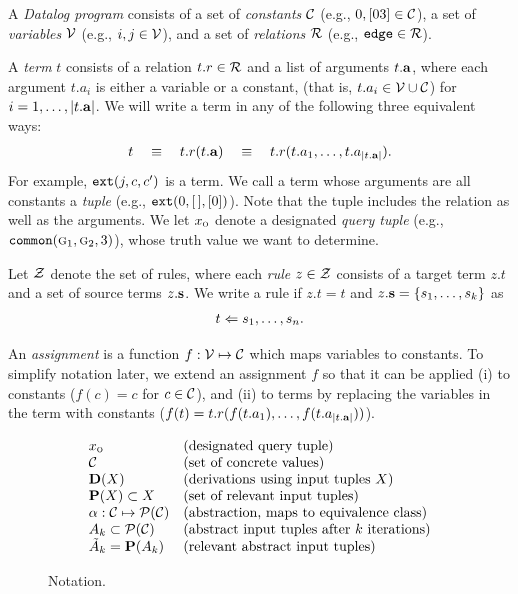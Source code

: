 
A {\em Datalog program} consists of
a set of {\em constants} $\mathcal{C}$ (e.g., $0,[03] \in \mathcal{C}$),
a set of {\em variables} $\mathcal{V}$ (e.g., $i, j \in \mathcal{V}$), and
a set of {\em relations} $\mathcal{R}$ (e.g., $\text{\tt edge} \in \mathcal{R}$).

A {\em term} $t$ consists of a relation $t.r \in \mathcal{R}$ and a list of arguments $t.\mathbf{a}$,
where each argument $t.a_i$ is either a variable or a constant,
(that is, $t.a_i \in \mathcal{V} \cup \mathcal{C}$) for $i = 1, \dots, |t.\mathbf{a}|$.
We will write a term in any of the following three equivalent ways:
\begin{align}
t \quad\equiv\quad t.r(t.\mathbf{a}) \quad\equiv\quad t.r(t.a_1, \dots, t.a_{|t.\mathbf{a}|}).
\end{align}
For example, $\text{\tt ext}(j,c,c')$ is a term.
We call a term whose arguments are all constants a {\em tuple}
(e.g., $\text{\tt ext}(0, [\,], [0])$).
Note that the tuple includes the relation as well as the arguments.
We let $x_\text{\sc o}$ denote a designated {\em query tuple} (e.g., $\text{\tt common}(\text{\sc g}_1,\text{\sc g}_2,3)$),
whose truth value we want to determine.

Let $\mathcal{Z}$ denote the set of rules,
where each {\em rule} $z \in \mathcal{Z}$ consists of a target term $z.t$ and a set of source terms $z.\mathbf{s}$.
We write a rule if $z.t = t$ and $z.\mathbf{s} = \{ s_1, \dots, s_k \}$ as
\begin{align}
t \Leftarrow s_1, \dots, s_n.
\end{align}

An {\em assignment} is a function $f : \mathcal{V} \mapsto \mathcal{C}$ which maps variables to
constants.  To simplify notation later, we extend an assignment $f$ so that it
can be applied (i) to constants ($f(c) = c$ for $c \in \mathcal{C}$), and (ii) to terms by
replacing the variables in the term with constants ($f(t) = t.r(f(t.a_1), \dots, f(t.a_{|t.\mathbf{a}|}))$).

\begin{figure}[t]
\[
\begin{array}{ll}
x_\text{\sc o}                           & \text{(designated query tuple)} \\
\mathcal{C}                           & \text{(set of concrete values)} \\
\mathbf{D}(X)                        & \text{(derivations using input tuples $X$)} \\
\mathbf{P}(X) \subset X              & \text{(set of relevant input tuples)} \\
\alpha : \mathcal{C} \mapsto \mathcal{P}(\mathcal{C}) & \text{(abstraction, maps to equivalence class)} \\
A_k \subset \mathcal{P}(\mathcal{C})          & \text{(abstract input tuples after $k$ iterations)} \\
\tilde A_k = \mathbf{P}(A_k)         & \text{(relevant abstract input tuples)} \\
\end{array}
\]
\caption{\label{fig:notation} Notation.}
\end{figure}

